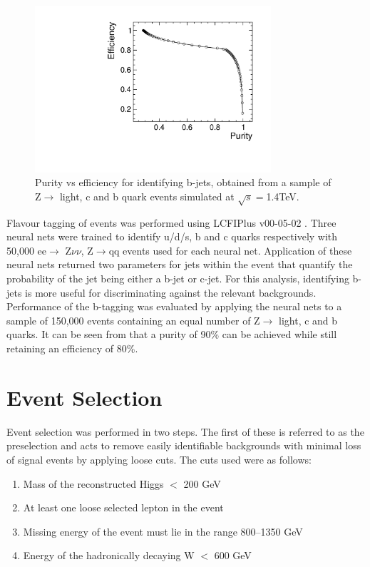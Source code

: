 \begin{figure}
  \centering
  \includegraphics[width=0.78\textwidth,keepaspectratio]{HiggsAnalysis/figures/updatedpurityvsefficiency.pdf}
  \caption[B-Tagging Purity vs Efficiency]{Purity vs efficiency for identifying b-jets, obtained from a sample of Z$\rightarrow$ light, c and b quark events simulated at $\sqrt{s}=$1.4TeV.}
  \label{btag}
\end{figure}

Flavour tagging of events was performed using LCFIPlus v00-05-02 \cite{Suehara:2015ura}. Three neural nets were trained to identify u/d/s, b and c quarks respectively with 50,000 ee$\rightarrow$ Z$\nu\nu$, Z$\rightarrow$qq events used for each neural net. Application of these neural nets returned two parameters for jets within the event that quantify the probability of the jet being either a b-jet or c-jet. For this analysis, identifying b-jets is more useful for discriminating against the relevant backgrounds. Performance of the b-tagging was evaluated by applying the neural nets to a sample of 150,000 events containing an equal number of Z$\rightarrow$ light, c and b quarks. It can be seen from  that a purity of 90\% can be achieved while still retaining an efficiency of 80\%.

\section{Event Selection}

Event selection was performed in two steps. The first of these is referred to as the preselection and acts to remove easily identifiable backgrounds with minimal loss of signal events by applying loose cuts. The cuts used were as follows:

\begin{enumerate}

\item Mass of the reconstructed Higgs $<$ 200 GeV
\item At least one loose selected lepton in the event
\item Missing energy of the event must lie in the range 800--1350 GeV
\item Energy of the hadronically decaying W $<$ 600 GeV

\end{enumerate}



